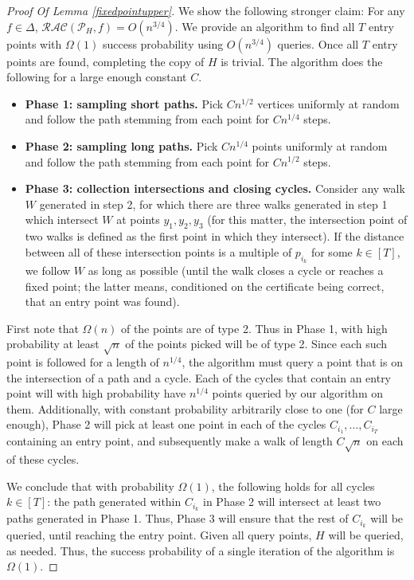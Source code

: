 \documentclass[11pt]{article}
\numberwithin{equation}{section}
\renewcommand{\P}{\mathcal{P}}
\newcommand{\1}{\mathbf{1}}
\begin{document}
\begin{proof}[Proof Of Lemma \ref{fixedpointupper}]
We show the following stronger claim: For any $f \in \Delta$, $
\mathcal{RAC}(\P_H, f) = O(n^{3/4})$. We provide an algorithm to find all $T$ entry points with $\Omega(1)$ success probability using $O(n^{3/4})$ queries. Once all $T$ entry points are found, completing the copy of $H$ is trivial. The algorithm does the following for a large enough constant $C$.
\begin{itemize}
    \item \textbf{Phase 1: sampling short paths.} Pick $Cn^{1/2}$ vertices uniformly at random and follow the path stemming from each point for $Cn^{1/4}$ steps.
    \item \textbf{Phase 2: sampling long paths.} Pick $Cn^{1/4}$ points uniformly at random and follow the path stemming from each point for $Cn^{1/2}$ steps.
    \item \textbf{Phase 3: collection intersections and closing cycles.} Consider any walk $W$ generated in step 2, for which there are three walks generated in step 1 which intersect $W$ at points $y_1, y_2, y_3$ (for this matter, the intersection point of two walks is defined as the first point in which they intersect). If the distance between all of these intersection points is a multiple of $p_{i_k}$ for some $k \in [T]$, we follow $W$ as long as possible (until the walk closes a cycle or reaches a fixed point; the latter means, conditioned on the certificate being correct, that an entry point was found). \end{itemize} 

First note that $\Omega(n)$ of the points are of type 2. Thus in Phase 1, with high probability at least $\sqrt{n}$ of the points picked will be of type 2. Since each such point is followed for a length of $n^{1/4}$, the algorithm must query a point that is on the intersection of a path and a cycle. Each of the cycles that contain an entry point will with high probability have $n^{1/4}$ points queried by our algorithm on them. Additionally, with constant probability arbitrarily close to one (for $C$ large enough), Phase 2 will pick at least one point in each of the cycles $C_{i_1}, \ldots, C_{i_T}$ containing an entry point, and subsequently make a walk of length $C\sqrt{n}$ on each of these cycles.

We conclude that with probability $\Omega(1)$, the following holds for all cycles $k \in [T]$: the path generated within $C_{i_k}$ in Phase 2 will intersect at least two paths generated in Phase 1. Thus, Phase 3 will ensure that the rest of $C_{i_k}$ will be queried, until reaching the entry point. Given all query points, $H$ will be queried, as needed. Thus, the success probability of a single iteration of the algorithm is $\Omega(1)$.


\end{proof}
\end{document}
